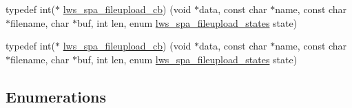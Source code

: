\begin{DoxyCompactItemize}
typedef int($\ast$ \hyperlink{group__form-parsing_ga5a70527c0861c2ffa3d29333a6aa7f8e}{lws\+\_\+spa\+\_\+fileupload\+\_\+cb}) (void $\ast$data, const char $\ast$name, const char $\ast$filename, char $\ast$buf, int len, enum \hyperlink{group__form-parsing_ga41a74a822771d3dce89751aa3bce28ae}{lws\+\_\+spa\+\_\+fileupload\+\_\+states} state)
\item 
typedef int($\ast$ \hyperlink{group__form-parsing_ga5a70527c0861c2ffa3d29333a6aa7f8e}{lws\+\_\+spa\+\_\+fileupload\+\_\+cb}) (void $\ast$data, const char $\ast$name, const char $\ast$filename, char $\ast$buf, int len, enum \hyperlink{group__form-parsing_ga41a74a822771d3dce89751aa3bce28ae}{lws\+\_\+spa\+\_\+fileupload\+\_\+states} state)
\end{DoxyCompactItemize}
\subsection*{Enumerations}
